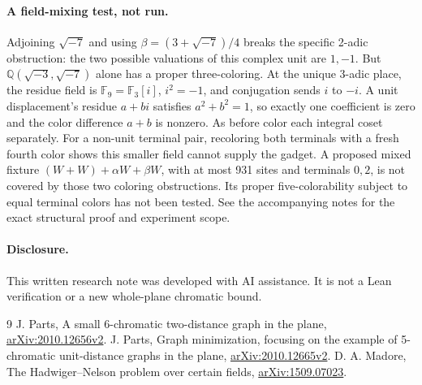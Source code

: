 \documentclass[11pt,letterpaper]{article}
\begin{document}
\paragraph{A field-mixing test, not run.}
Adjoining \(\sqrt{-7}\) and using \(\beta=(3+\sqrt{-7})/4\) breaks
the specific 2-adic obstruction: the two possible valuations
of this complex unit are \(1,-1\). But
\(\mathbb Q(\sqrt{-3},\sqrt{-7})\) alone has a proper three-coloring.
At the unique 3-adic place, the residue field is
\(\mathbb F_9=\mathbb F_3[i]\), \(i^2=-1\), and conjugation sends
\(i\) to \(-i\). A unit displacement's residue \(a+bi\) satisfies
\(a^2+b^2=1\), so exactly one coefficient is zero and the color
difference \(a+b\) is nonzero. As before color each integral
coset separately. For a non-unit terminal pair, recoloring both
terminals with a fresh fourth color shows this smaller field
cannot supply the gadget. A proposed mixed fixture
\((W+W)+\alpha W+\beta W\), with at most 931 sites and terminals
\(0,2\), is not covered by those two coloring obstructions.
Its proper five-colorability subject to equal terminal colors
has not been tested. See the accompanying notes for the exact
structural proof and experiment scope.

\paragraph{Disclosure.} This written research note was developed
with AI assistance. It is not a Lean verification or a new
whole-plane chromatic bound.

\begin{thebibliography}{9}
 J. Parts, A small 6-chromatic two-distance graph
in the plane, \href{https://arxiv.org/abs/2010.12656v2}{arXiv:2010.12656v2}.
 J. Parts, Graph minimization, focusing on the example
of 5-chromatic unit-distance graphs in the plane,
\href{https://arxiv.org/abs/2010.12665v2}{arXiv:2010.12665v2}.
 D. A. Madore, The Hadwiger--Nelson problem over certain
fields, \href{https://arxiv.org/abs/1509.07023}{arXiv:1509.07023}.
\end{thebibliography}
\end{document}
